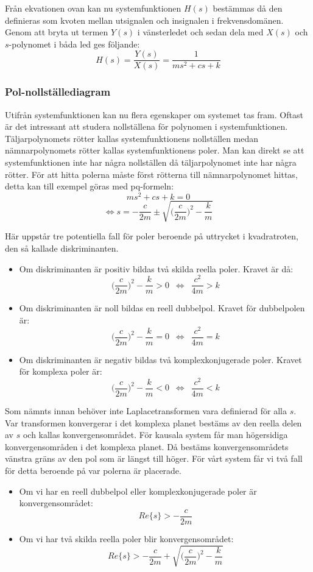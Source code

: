 Från ekvationen ovan kan nu systemfunktionen $H(s)$ bestämmas då den definieras som kvoten mellan utsignalen och insignalen i frekvensdomänen. Genom att bryta ut termen $Y(s)$ i vänsterledet och sedan dela med $X(s)$ och $s$-polynomet i båda led ges följande: 
$$H(s)=\frac{Y(s)}{X(s)}=\frac{1}{ms^2+cs+k}$$
\newline

\subsubsection{Pol-nollställediagram}
Utifrån systemfunktionen kan nu flera egenskaper om systemet tas fram. Oftast är det intressant att studera nollställena för polynomen i systemfunktionen. Täljarpolynomets rötter kallas systemfunktionens nollställen medan nämnarpolynomets rötter kallas systemfunktionens poler. Man kan direkt se att systemfunktionen inte har några nollställen då täljarpolynomet inte har några rötter. För att hitta polerna måste först rötterna till nämnarpolynomet hittas, detta kan till exempel göras med pq-formeln:
$$ms^2+cs+k=0$$
$$\Longleftrightarrow s=-\frac{c}{2m}\pm \sqrt{\bigg(\frac{c}{2m}\bigg)^2-\frac{k}{m}}$$

Här uppstår tre potentiella fall för poler beroende på uttrycket i kvadratroten, den så kallade diskriminanten.

\begin{itemize}
    \item Om diskriminanten är positiv bildas två skilda reella poler. Kravet är då: 
    $$ \bigg(\frac{c}{2m}\bigg)^2-\frac{k}{m} > 0 \,\,\, \Longleftrightarrow\,\,\, \frac{c^2}{4m} > k $$   
    \item Om diskriminanten är noll bildas en reell dubbelpol. Kravet för dubbelpolen är: 
    $$ \bigg(\frac{c}{2m}\bigg)^2-\frac{k}{m} = 0 \,\,\, \Longleftrightarrow\,\,\, \frac{c^2}{4m} = k $$
    \item Om diskriminanten är negativ bildas två komplexkonjugerade poler. Kravet för komplexa poler är: 
    $$ \bigg(\frac{c}{2m}\bigg)^2-\frac{k}{m} < 0 \,\,\, \Longleftrightarrow\,\,\, \frac{c^2}{4m} < k $$
\end{itemize}

Som nämnts innan behöver inte Laplacetransformen vara definierad för alla $s$. Var transformen konvergerar i det komplexa planet bestäms av den reella delen av $s$ och kallas konvergensområdet. För kausala system får man högersidiga konvergensområden i det komplexa planet. Då bestäms konvergensområdets vänstra gräns av den pol som är längst till höger. För vårt system får vi två fall för detta beroende på var polerna är placerade.
\begin{itemize}
    \item Om vi har en reell dubbelpol eller komplexkonjugerade poler är konvergensområdet:
    $$ Re\{s\} > -\frac{c}{2m} $$
    \item Om vi har två skilda reella poler blir konvergensområdet:
    $$ Re\{s\} > -\frac{c}{2m}+\sqrt{\bigg(\frac{c}{2m}\bigg)^2-\frac{k}{m}} $$
\end{itemize}

